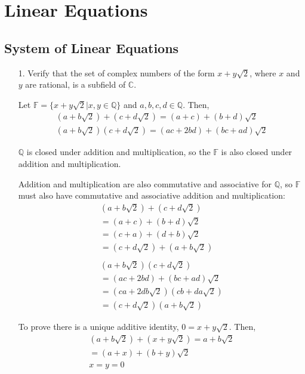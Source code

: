 \documentclass{article}
\begin{document}
\section{Linear Equations}

\setcounter{subsection}{1} %

\subsection{System of Linear Equations}

\begin{enumerate}[listparindent=\parindent]
\item[1.] Verify that the set of complex numbers of the form \(x + y\sqrt{2}\),
    where \(x\) and \(y\) are rational, is a subfield of \(\mathbb C\).

Let \(\mathbb F = \{x + y\sqrt{2} | x, y \in \mathbb Q\}\) and \(a, b, c, d \in \mathbb Q\). Then,
\begin{gather*}
    (a + b\sqrt{2}) + (c + d\sqrt{2}) = (a + c) + (b + d)\sqrt{2} \\
    (a + b\sqrt{2})(c + d\sqrt{2}) = (ac + 2bd) + (bc + ad)\sqrt{2}
\end{gather*}

\(\mathbb Q\) is closed under addition and multiplication,
so the \(\mathbb F\) is also closed under addition and multiplication.

Addition and multiplication are also commutative and associative for \(\mathbb Q\),
so \(\mathbb F\) must also have commutative and associative addition and multiplication:
\begin{gather*}
    (a + b\sqrt{2}) + (c + d\sqrt{2}) \\
    = (a + c) + (b + d)\sqrt{2} \\
    = (c + a) + (d + b)\sqrt{2} \\
    = (c + d\sqrt{2}) + (a + b\sqrt{2}) \\
    \\
    (a + b\sqrt{2})(c + d\sqrt{2}) \\
    = (ac + 2bd) + (bc + ad)\sqrt{2} \\
    = (ca + 2db\sqrt{2})(cb + da\sqrt{2}) \\
    = (c + d\sqrt{2})(a + b\sqrt{2})
\end{gather*}

To prove there is a unique additive identity, \(0 = x + y\sqrt{2}\). Then,
\begin{gather*}
    (a + b\sqrt{2}) + (x + y\sqrt{2}) = a + b\sqrt{2} \\
    = (a + x) + (b + y)\sqrt{2}\ \\
    x = y = 0
\end{gather*}


\end{enumerate}
\end{document}
